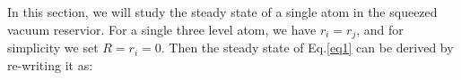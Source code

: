 \documentclass[aps,showpacs,twocolumn,twoside,groupedaddress]{revtex4}
\begin{document}
In this section, we will study the steady state of a single atom in the squeezed vacuum reservior. For a single three level atom, we have $r_i=r_j$, and for simplicity we set $R=r_i=0$. Then the steady state of Eq.\eqref{eq1} can be derived by re-writing it as:
\end{document}
